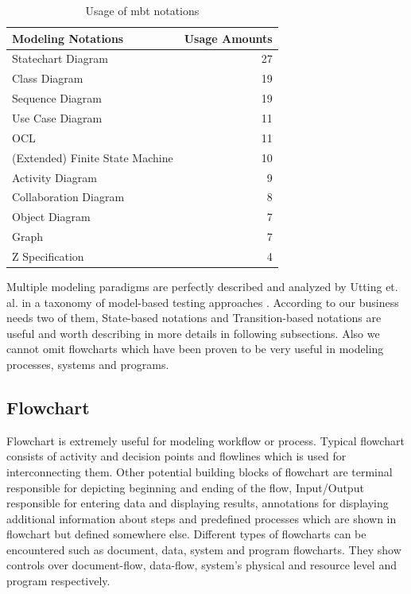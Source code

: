 \begin{table}[]
    \centering
    \begin{tabular}{|l|r|}
        \hline
        \textbf{Modeling Notations} & \textbf{Usage Amounts} \\
        \hline
        Statechart Diagram & 27 \\
        \hline
        Class Diagram & 19 \\
        \hline
        Sequence Diagram & 19 \\
        \hline
        Use Case Diagram & 11 \\
        \hline
        OCL & 11 \\
        \hline
        (Extended) Finite State Machine & 10 \\
        \hline
        Activity Diagram & 9 \\
        \hline
        Collaboration Diagram & 8 \\
        \hline
        Object Diagram & 7 \\
        \hline
        Graph & 7 \\
        \hline
        Z Specification & 4 \\
        \hline
    \end{tabular}
    \caption{Usage of \acrshort{mbt} notations \cite{Survey}}
    \label{tab:Usage_Survey}
\end{table}

Multiple modeling paradigms are perfectly described and analyzed by Utting et. al. in a taxonomy of model-based testing approaches \cite{Pretschner_Taxonomy}. According to our business needs two of them, State-based notations and Transition-based notations are useful and worth describing in more details in following subsections. Also we cannot omit flowcharts which have been proven to be very useful in modeling processes, systems and programs. 

\subsection{Flowchart}
\par
Flowchart \cite{Flowchart} is extremely useful for modeling workflow or process. Typical flowchart consists of activity and decision points and flowlines which is used for interconnecting them. Other potential building blocks of flowchart are terminal responsible for depicting beginning and ending of the flow, Input/Output responsible for entering data and displaying results, annotations for displaying additional information about steps and predefined processes which are shown in flowchart but defined somewhere else. Different types of flowcharts can be encountered such as document, data, system and program flowcharts. They show controls over document-flow, data-flow, system's physical and resource level and program respectively.

